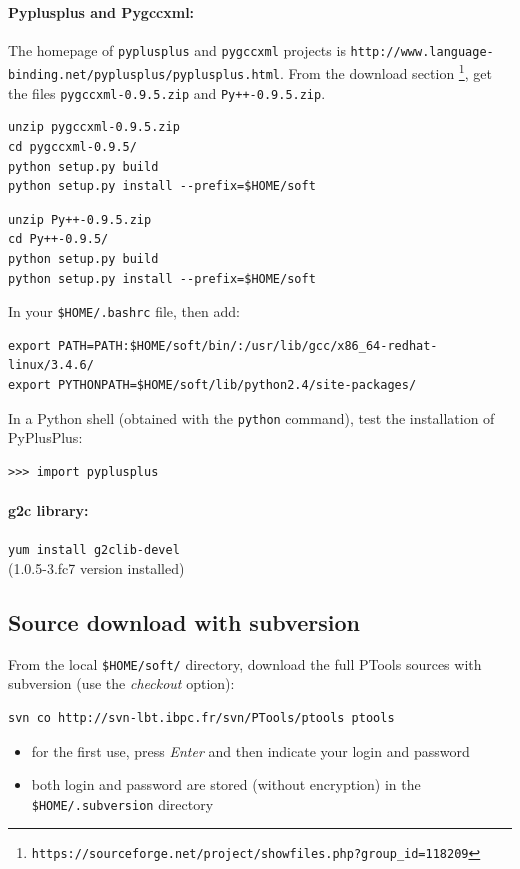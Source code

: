\documentclass[12pt,a4paper]{article}
\begin{document}
\paragraph{Pyplusplus and Pygccxml: }
The homepage of {\tt pyplusplus} and {\tt pygccxml} projects is 
{\tt http://www.language-binding.net/pyplusplus/pyplusplus.html}. From the
download section \footnote{\tt https://sourceforge.net/project/showfiles.php?group\_id=118209}, 
get the files {\tt pygccxml-0.9.5.zip} and {\tt Py++-0.9.5.zip}.

\begin{verbatim}
unzip pygccxml-0.9.5.zip
cd pygccxml-0.9.5/
python setup.py build
python setup.py install --prefix=$HOME/soft
\end{verbatim}

\begin{verbatim}
unzip Py++-0.9.5.zip 
cd Py++-0.9.5/
python setup.py build
python setup.py install --prefix=$HOME/soft
\end{verbatim}

In your {\tt \$HOME/.bashrc} file, then add:
\begin{verbatim}
export PATH=PATH:$HOME/soft/bin/:/usr/lib/gcc/x86_64-redhat-linux/3.4.6/
export PYTHONPATH=$HOME/soft/lib/python2.4/site-packages/
\end{verbatim}

In a Python shell (obtained with the {\tt python} command), test the installation
of PyPlusPlus:
\begin{verbatim}
>>> import pyplusplus
\end{verbatim}

\paragraph{g2c library:} {\tt yum install g2clib-devel} \\
(1.0.5-3.fc7 version installed)

\subsection{Source download with subversion}

From the local {\tt \$HOME/soft/} directory, download the full PTools sources with subversion (use the {\it checkout} option):
\begin{verbatim}
svn co http://svn-lbt.ibpc.fr/svn/PTools/ptools ptools
\end{verbatim}

\begin{itemize}
\item for the first use, press {\it Enter} and then indicate your login and password
\item both login and password are stored (without encryption) in the {\tt \$HOME/.subversion} directory
\end{itemize}
\end{document}
